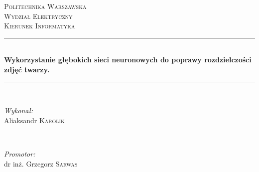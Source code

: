 \documentclass[a4paper,11pt, notitlepage ]{article}
\begin{document}
	
	\begin{titlepage}
		
		\newcommand{\HRule}{\rule{\linewidth}{0.5mm}} %
		
		\center %
		
		
		\textsc{\LARGE Politechnika Warszawska}\\[1.5cm] %
		\textsc{\Large Wydział Elektryczny }\\[0.5cm] %
		\textsc{\large Kierunek Informatyka }\\[0.5cm] %
		
		
		\HRule \\[0.4cm]
		{ \huge \bfseries Wykorzystanie głębokich sieci neuronowych do poprawy rozdzielczości zdjęć twarzy. }\\[0.3cm] %
		\HRule \\[1.5cm]
		
		
		\begin{minipage}{0.4\textwidth}
			\begin{flushleft} \large
				\emph{Wykonał:}\\
				Aliaksandr \textsc{Karolik} %
			\end{flushleft}
		\end{minipage}
		~
		\begin{minipage}{0.4\textwidth}
			\begin{flushright} \large
				\emph{Promotor:} \\
				dr inż. Grzegorz \textsc{Sarwas} %
			\end{flushright}
		\end{minipage}\\[2cm]
		

\end{titlepage}
\end{document}
